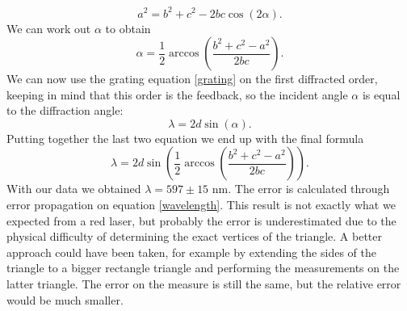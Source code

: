 \documentclass[a4paper,10pt]{article}
\begin{document}
\begin{equation}a^2 = b^2 + c^2 -2bc\cos(2\alpha).\end{equation}
We can work out $\alpha$ to obtain
\begin{equation}\alpha = \frac{1}{2}\arccos\left(\frac{b^2 + c^2 - a^2}{2bc}\right).\end{equation}
We can now use the grating equation \eqref{grating} on the first diffracted order, keeping in mind that this order is the feedback, so the incident angle $\alpha$ is equal to the diffraction angle:
\begin{equation}\lambda = 2d\sin(\alpha).\end{equation}
Putting together the last two equation we end up with the final formula
\begin{equation}\label{wavelength}\lambda = 2d\sin\left(\frac{1}{2}\arccos\left(\frac{b^2 + c^2 - a^2}{2bc}\right)\right).\end{equation}
With our data we obtained $\lambda = 597\pm15$ nm. The error is calculated through error propagation on equation \eqref{wavelength}. This result is not exactly what we expected from a red laser, but probably the error is underestimated due to the physical difficulty of determining the exact vertices of the triangle. A better approach could have been taken, for example by extending the sides of the triangle to a bigger rectangle triangle and performing the measurements on the latter triangle. The error on the measure is still the same, but the relative error would be much smaller.
\end{document}
